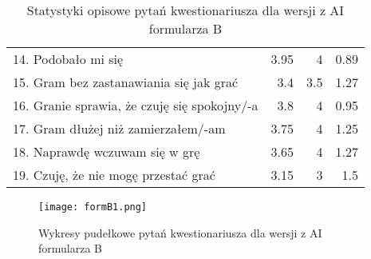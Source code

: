 \begin{table}[h!]
\begin{center}
\begin{tabular}{|m{10em}|r|r|r|}
            14. Podobało mi się                                               & 3.95          & 4       & 0.89           \\
            15. Gram bez zastanawiania się jak grać                           & 3.4           & 3.5     & 1.27           \\
            16. Granie sprawia, \newline że czuję się spokojny/-a             & 3.8           & 4       & 0.95           \\
            17. Gram dłużej \newline niż zamierzałem/-am                      & 3.75          & 4       & 1.25           \\
            18. Naprawdę wczuwam się w grę                                    & 3.65          & 4       & 1.27           \\
            19. Czuję, że nie mogę przestać grać                              & 3.15          & 3       & 1.5            \\
            \hline
        \end{tabular}
    \end{center}
    \caption{Statystyki opisowe pytań kwestionariusza dla wersji z AI formularza B}\label{tab1:appendixB_7}
\end{table}

\begin{figure}[h!]
    \centering
    \texttt{[image: formB1.png]}
    \caption{Wykresy pudełkowe pytań kwestionariusza dla wersji z AI formularza B}
    \label{fig:appendixB_formB1}
\end{figure}

